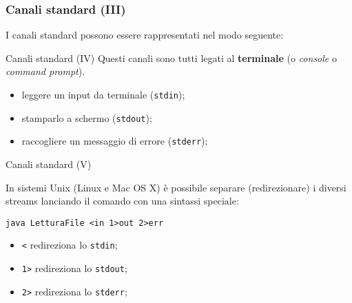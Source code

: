 \begin{frame}[fragile]\frametitle{Canali standard (III)}

  I canali standard possono essere rappresentati nel modo seguente:
  \begin{center}
  \end{center}

\end{frame}

\begin{frame}{Canali standard (IV)}
  Questi canali sono tutti legati al \textbf{terminale} (o \emph{console} o \emph{command prompt}).
  
  \begin{itemize}[<+(1)->]
   \item leggere un input da terminale (\texttt{stdin});
   \item stamparlo a schermo (\texttt{stdout});
   \item raccogliere un messaggio di errore (\texttt{stderr});
  \end{itemize}
\end{frame} 

\begin{frame}{Canali standard (V)}

  In sistemi Unix (Linux e Mac OS X) è possibile separare (redirezionare) i diversi streams
  lanciando il comando con una sintassi speciale:
  \begin{center}
    \texttt{java LetturaFile <in 1>out 2>err}
  \end{center}
  
   \begin{itemize}[<+(1)->]
     \item \texttt{<} redireziona lo \texttt{stdin};
     \item \texttt{1>} redireziona lo \texttt{stdout};
     \item \texttt{2>} redireziona lo \texttt{stderr};
   \end{itemize}

\end{frame}
